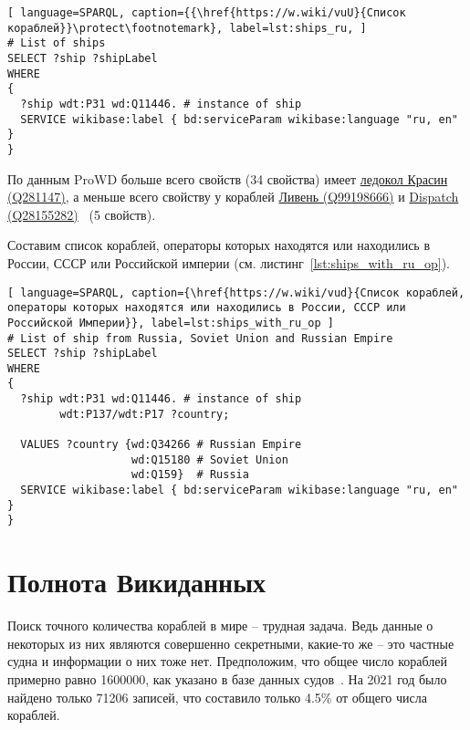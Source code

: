 \begin{lstlisting}[ language=SPARQL, caption={{\href{https://w.wiki/vuU}{Список кораблей}}\protect\footnotemark}, label=lst:ships_ru, ]
# List of ships
SELECT ?ship ?shipLabel
WHERE
{
  ?ship wdt:P31 wd:Q11446. # instance of ship
  SERVICE wikibase:label { bd:serviceParam wikibase:language "ru, en" }
}
\end{lstlisting}

По данным ProWD больше всего свойств (34 свойства) имеет \href{https://www.wikidata.org/wiki/Q281147}{ледокол Красин (Q281147)}, а меньше всего свойству у кораблей \href{https://www.wikidata.org/wiki/Q99198666}{Ливень (Q99198666)} и \href{https://www.wikidata.org/wiki/Q28155282}{Dispatch (Q28155282)}~\cite{ProWD_ru_ships} (5 свойств).

Составим список кораблей, операторы которых находятся или находились в России, СССР или Российской империи (см. листинг~\ref{lst:ships_with_ru_op}).

\begin{lstlisting}[ language=SPARQL, caption={\href{https://w.wiki/vud}{Cписок кораблей, операторы которых находятся или находились в России, СССР или Российской Империи}}, label=lst:ships_with_ru_op ]
# List of ship from Russia, Soviet Union and Russian Empire
SELECT ?ship ?shipLabel
WHERE
{
  ?ship wdt:P31 wd:Q11446. # instance of ship
        wdt:P137/wdt:P17 ?country; 
    
  VALUES ?country {wd:Q34266 # Russian Empire
                   wd:Q15180 # Soviet Union
                   wd:Q159}  # Russia
  SERVICE wikibase:label { bd:serviceParam wikibase:language "ru, en" }
}
\end{lstlisting}


\section{Полнота Викиданных}

\label{question:ship_1}

Поиск точного количества кораблей в мире -- трудная задача. Ведь данные о некоторых из них являются совершенно секретными, какие-то же -- это частные судна и информации о них тоже нет. Предположим, что общее число кораблей примерно равно \num{1600000}, как указано в базе данных судов~\cite{FleetMon}. На 2021 год было найдено только \num{71206} записей, что составило только 4.5\% от общего числа кораблей.


